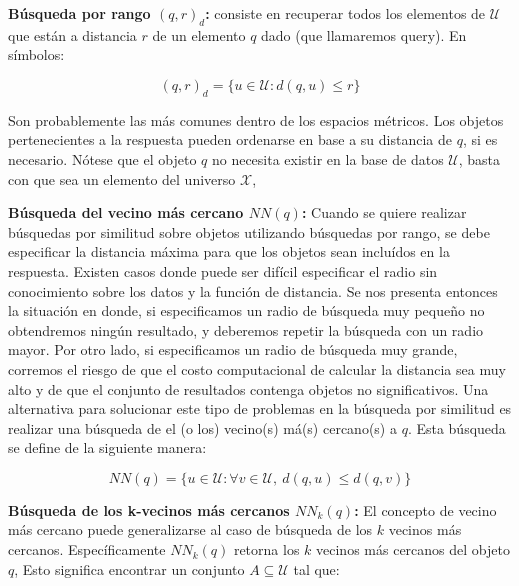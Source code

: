 \begin{description}
   \item {\textbf{B\'usqueda por rango $(q,r)_{d}$:}}
          consiste en recuperar todos los elementos  de $\mathcal{U}$
          que est\'an a distancia $r$ de un elemento $q$ dado (que llamaremos
          query).  En s\'imbolos:

           \vspace{-3mm}
          \[(q,r)_{d}=\{u \in \mathcal{U}:  d(q,u) \leq r\}\]
          
          Son probablemente las m\'as comunes dentro de los espacios
           m\'etricos.  Los objetos pertenecientes a la respuesta pueden 
           ordenarse en base a su distancia de $q$, si es necesario.
            N\'otese que el objeto $q$ no necesita existir en la base de datos $\mathcal{U}$,
            basta con que sea un elemento del universo $\mathcal{X}$, 

   \item{\textbf{ B\'usqueda del vecino m\'as cercano $NN(q)$:}}
         Cuando se quiere realizar b\'usquedas por similitud sobre objetos 
         utilizando b\'usquedas por rango, se debe especificar la distancia 
         m\'axima para que los objetos sean inclu\'idos en la respuesta. Existen 
         casos donde puede ser dif\'icil especificar el radio sin conocimiento
          sobre los datos y la funci\'on de distancia. 
          Se nos presenta entonces la situaci\'on en donde, si especificamos 
          un radio de b\'usqueda muy peque\~no no obtendremos ning\'un resultado, 
          y deberemos repetir la b\'usqueda con un radio mayor. 
          Por otro lado, si especificamos un radio de b\'usqueda 
          muy grande, corremos el riesgo de que el costo computacional de calcular 
          la distancia sea muy alto y de que el conjunto de resultados contenga 
          objetos no significativos. 
          Una alternativa para solucionar este tipo de problemas en la b\'usqueda por
           similitud es realizar una b\'usqueda de el (o los)  vecino(s) m\'a(s) cercano(s)
           a $q$. Esta b\'usqueda se define de la siguiente manera:

          \vspace{-3mm}
          \[ NN(q)=\{u \in \mathcal{U} : \forall v \in \mathcal{U},
          \ d(q,u) \leq d(q,v)\}\]
          

   \item {\textbf{ B\'usqueda de los k-vecinos m\'as cercanos $NN_{k}(q)$:}}
         El concepto de vecino m\'as cercano puede generalizarse al caso 
         de b\'usqueda de los $k$ vecinos m\'as cercanos. Espec\'ificamente
          $NN_{k}(q)$ retorna los $k$ vecinos m\'as cercanos del objeto $q$, 
          Esto significa encontrar un conjunto
          $A \subseteq \mathcal{U} $ tal que:


\end{description}
